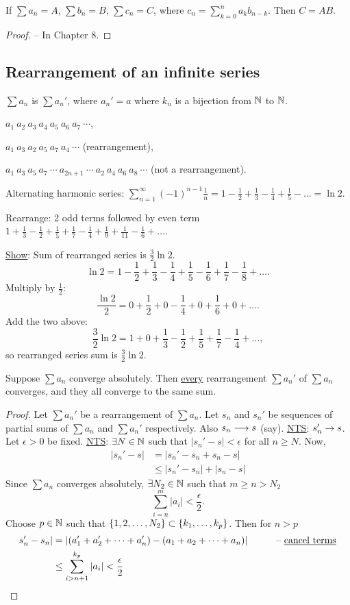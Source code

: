 \documentclass[]{article}
\begin{document}
\begin{theorem}
	\label{thm-3-51}
	If $\sum a_n = A$, $\sum b_n = B$, $\sum c_n=C$, where $c_n=\sum_{k=0}^n a_kb_{n-k}$.
	Then $C=AB$.
\end{theorem}
\begin{proof}
	-- In Chapter 8.
\end{proof}

\subsection*{Rearrangement of an infinite series}

$\sum a_n$ is $\sum a_n'$, where $a_n'=a$ where $k_n$ is a bijection from $\mathbb{N}$ to $\mathbb{N}$.
\begin{example}
	$a_1\ a_2\ a_3\ a_4\ a_5\ a_6\ a_7\ \cdots$, 
	
	$a_1\ a_3\ a_2\ a_5\ a_7\ a_4\ \cdots$ (rearrangement),
	
	$a_1\ a_3\ a_5\ a_7\ \cdots\ a_{2n+1}\ \cdots\ a_2\ a_4\ a_6\ a_8\ \cdots$ (not a rearrangement).
\end{example}
\begin{example}
	Alternating harmonic series: $\sum_{n=1}^\infty (-1)^{n-1}\frac1n = 1-\frac12+\frac13-\frac14+\frac15-\dots = \ln 2$.
	
	Rearrange: 2 odd terms followed by even term $1+\frac13-\frac12+\frac15+\frac17-\frac14+\frac19+\frac1{11}-\frac16+\dots$.
	
	\ul{\ul{Show}}: Sum of rearranged series is $\frac32\ln2$.
	$$\ln 2 = 1-\frac12+\frac13-\frac14+\frac15-\frac16+\frac17-\frac18+\dots.$$
	Multiply by $\frac12$:
	$$\frac{\ln2}{2} = 0+\frac12+0-\frac14+0+\frac16+0+\dots.$$
	Add the two above:
	$$ \frac32\ln2 = 1+0+\frac13-\frac12 + \frac15 + \frac17-\frac14+\dots,$$
	so rearranged series sum is $\frac32\ln 2$.
\end{example}

\begin{theorem}
	Suppose $\sum a_n$ converge absolutely.
	Then \ul{every} rearrangement $\sum a_n'$ of $\sum a_n$ converges, and they all converge to the same sum.
\end{theorem}
\begin{proof}
	Let $\sum a_n'$ be a rearrangement of $\sum a_n$.
	Let $s_n$ and $s_n'$ be sequences of partial sums of $\sum a_n$ and $\sum a_n'$ respectively.
	Also $s_n\longrightarrow s$ (say). \ul{\ul{NTS}}: $s_n'\rightarrow s$.
	Let $\epsilon>0$ be fixed.
	\ul{NTS}: $\exists N\in\mathbb{N}$ such that $|s_n'-s|<\epsilon$ for all $n\geq N$.
	Now, 
	\begin{align*}
		|s_n'-s|&=|s_n'-s_n+s_n-s| \\
				&\leq |s_n'-s_n|+|s_n-s|
	\end{align*}
	Since $\sum a_n$ converges absolutely, $\exists N_2\in\mathbb{N}$ such that $m\geq n>N_2$
	$$\sum_{i=n}^m |a_i| < \frac\epsilon2.$$
	Choose $p\in\mathbb{N}$ such that $\left\{ 1,2,\dots,N_2 \right\}\subset\left\{ k_1,\dots,k_p \right\}$.
	Then for $n>p$
	\begin{align*}
		s_n'-s_n| &= |(a_1'+a_2'+\dots+a_n')-(a_1+a_2+\dots+a_n)| &\qquad \text{-- \underline{cancel terms}} \\
				  &\leq \sum_{i>n+1}^{k_p} |a_i| < \frac\epsilon2
	\end{align*}
\end{proof}
\end{document}
